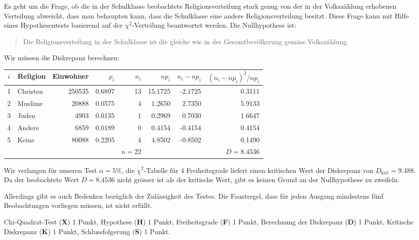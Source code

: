 \begin{loesung}
Es geht um die Frage, ob die in der Schulklasse beobachtete Religionsverteilung
stark genug von der in der Volkszählung erhobenen Verteilung abweicht,
dass man behaupten kann, dass die Schulklasse eine andere Religionsverteilung
besitzt.
Diese Frage kann mit Hilfe eines Hypothesentests basierend auf der
$\chi^2$-Verteilung beantwortet werden. Die Nullhypothese ist:
\begin{quotation}
\parindent 0pt
Die Religionsverteilung in der Schulklasse ist die gleiche wie in
der Gesamtbevölkerung gemäss Volkszählung.
\end{quotation}
Wir müssen die Diskrepanz berechnen:
\begin{center}
\begin{tabular}{|c|l|r|r|r|r|r|r|}
\hline
$i$&Religion&Einwohner&$p_i$    &$n_i$&$np_i$    &$n_i-np_i$&$(n_i-np_i)^2/np_i$\\
\hline
1  &Christen&   250535&0.6897   &   13&15.1725   &-2.1725   &0.3111\\
2  & Muslime&    20888&0.0575   &    4& 1.2650   & 2.7350   &5.9133\\
3  &   Juden&     4903&0.0135   &    1& 0.2969   & 0.7030   &1.6647\\
4  &  Andere&     6859&0.0189   &    0& 0.4154   &-0.4154   &0.4154\\
5  &   Keine&    80088&0.2205   &    4& 4.8502   &-0.8502   &0.1490\\
\hline
   &        &         &         &$n=22$&         &          &$D=8.4536$\\
\hline
\end{tabular}
\end{center}
Wir verlangen für unseren Test $\alpha=5\%$, die $\chi^2$-Tabelle
für 4 Freiheitsgrade liefert einen kritischen Wert der Diskrepanz
von $D_{\text{krit}}=9.488$. Da der beobachtete Wert $D=8.4536$
nicht grösser ist als der kritische Wert, gibt es keinen Grund an
der Nullhypothese zu zweifeln.

Allerdings gibt es auch Bedenken bezüglich der Zulässigkeit des
Testes.
Die Faustregel, dass für jeden Ausgang mindestens
fünf Beobachtungen vorliegen müssen, ist nicht erfüllt.
\end{loesung}

\begin{bewertung}
Chi-Quadrat-Test ({\bf X}) 1 Punkt,
Hypothese ({\bf H}) 1 Punkt,
Freiheitsgrade ({\bf F}) 1 Punkt,
Berechnung der Diskrepanz ({\bf D}) 1 Punkt,
Kritische Diskrepanz ({\bf K}) 1 Punkt,
Schlussfolgerung ({\bf S}) 1 Punkt.
\end{bewertung}
